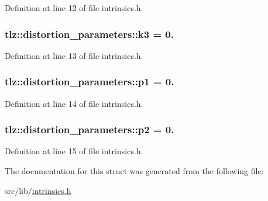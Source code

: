 Definition at line 12 of file intrinsics.\+h.

\subsubsection[{\texorpdfstring{k3}{k3}}]{ tlz\+::distortion\+\_\+parameters\+::k3 = 0.}\hypertarget{structtlz_1_1distortion__parameters_a498f99e384cb7e4e0b94eb20bdf988d6}{}\label{structtlz_1_1distortion__parameters_a498f99e384cb7e4e0b94eb20bdf988d6}


Definition at line 13 of file intrinsics.\+h.

\subsubsection[{\texorpdfstring{p1}{p1}}]{ tlz\+::distortion\+\_\+parameters\+::p1 = 0.}\hypertarget{structtlz_1_1distortion__parameters_a129d1ec5b0f94a1936c042d1b17a8735}{}\label{structtlz_1_1distortion__parameters_a129d1ec5b0f94a1936c042d1b17a8735}


Definition at line 14 of file intrinsics.\+h.

\subsubsection[{\texorpdfstring{p2}{p2}}]{ tlz\+::distortion\+\_\+parameters\+::p2 = 0.}\hypertarget{structtlz_1_1distortion__parameters_a1869618a7c2b3438a20fc488ccf4d818}{}\label{structtlz_1_1distortion__parameters_a1869618a7c2b3438a20fc488ccf4d818}


Definition at line 15 of file intrinsics.\+h.



The documentation for this struct was generated from the following file\+:\begin{DoxyCompactItemize}
\item 
src/lib/\hyperlink{intrinsics_8h}{intrinsics.\+h}\end{DoxyCompactItemize}
